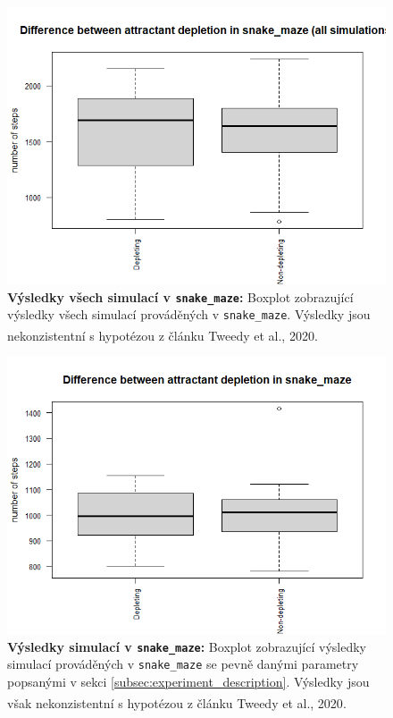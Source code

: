 \documentclass[10pt,a4paper,twocolumn]{article}
\begin{document}
\begin{figure}[tb]
  \centering
  \includegraphics[width=0.98\linewidth]{images/snake_all.png}
  \caption{\textbf{Výsledky všech simulací v \texttt{snake\_maze}:} 
  Boxplot zobrazující výsledky všech simulací prováděných v \texttt{snake\_maze}. Výsledky jsou nekonzistentní s hypotézou z článku Tweedy et al., 2020\textsuperscript{\cite{tweedy2020}}.}
  \label{fig:snake_all}
\end{figure} 

\begin{figure}[tb]
  \centering
  \includegraphics[width=0.98\linewidth]{images/snake.png}
  \caption{\textbf{Výsledky simulací v \texttt{snake\_maze}:} 
  Boxplot zobrazující výsledky simulací prováděných v \texttt{snake\_maze} se pevně danými parametry popsanými v sekci \ref{subsec:experiment_description}. Výsledky jsou však nekonzistentní s hypotézou z článku Tweedy et al., 2020\textsuperscript{\cite{tweedy2020}}.}
  \label{fig:snake}
\end{figure} 
\end{document}
